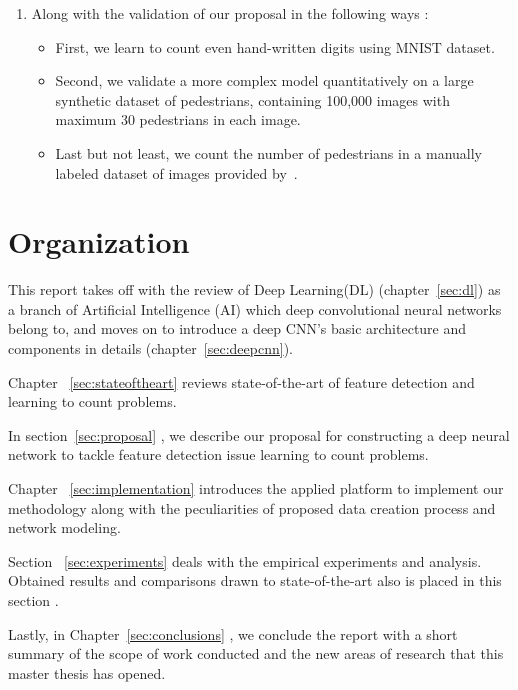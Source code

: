 \begin{enumerate}
	\item Along with the validation of our proposal in the following ways :
	\begin{itemize}
		\item First, we learn to count even hand-written digits using MNIST dataset. 
		\item Second, we validate a more complex model  quantitatively on a large synthetic dataset of pedestrians, containing 100,000 images with maximum 30 pedestrians in each image. 
		\item Last but not least, we count the number of pedestrians in a manually labeled dataset of images provided by~\citealt{chan2013ground}. 
	\end{itemize}
	
\end{enumerate}

\section{Organization}

This report takes off with the review of Deep Learning(DL) (chapter~\ref{sec:dl}) as a branch of Artificial Intelligence (AI) which deep convolutional neural networks belong to, and moves on to introduce a deep CNN's basic architecture and components in details (chapter~\ref{sec:deepcnn}). 


Chapter ~\ref{sec:stateoftheart} reviews state-of-the-art of feature detection and learning to count problems. 

In section~\ref{sec:proposal} , we describe our proposal for constructing a deep neural network to tackle feature detection issue learning to count problems. 

Chapter ~\ref{sec:implementation} introduces the applied platform to implement our methodology  along with the peculiarities of proposed data creation process and network modeling. 

Section ~\ref{sec:experiments} deals with the empirical experiments and analysis. Obtained results and comparisons drawn to state-of-the-art also is placed in this section .  

Lastly, in Chapter~\ref{sec:conclusions} , we conclude the report with a short summary of the scope of work conducted and the new areas of research that this master thesis has opened.
